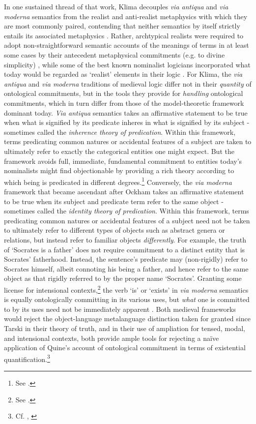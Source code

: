 \documentclass[]{article}
\begin{document}
In one sustained thread of that work, 
Klima decouples \emph{via antiqua} and \emph{via moderna} semantics 
from the realist and anti-realist metaphysics with which they are most commonly paired,
contending that neither semantics by itself strictly entails its associated metaphysics \autocite{Klima1999,Klima2011}. 
Rather, archtypical realists were required to adopt non-straightforward semantic accounts of the meanings of terms in at least some cases by their antecedent metaphysical commitments (e.g. to divine simplicity) \autocite{Klima2002b},
while some of the best known nominalist logicians incorporated what today would be regarded as `realist' elements in their logic \autocite{Klima2005}. 
For Klima, the \emph{via antiqua} and \emph{via moderna} traditions of medieval logic 
differ not in their \emph{quantity} of ontological commitments, 
but in the tools they provide for \emph{handling} ontological commitments, 
which in turn differ from those of the model-theoretic framework dominant today. 
\emph{Via antiqua} semantics takes an affirmative statement to be true when what is signified by its predicate inheres in what is signified by its subject - 
sometimes called the \emph{inherence theory of predication}. 
Within this framework, 
terms predicating common natures or accidental features of a subject are taken to ultimately refer to exactly the categorical entities one might expect. 
But the framework 
avoids full, immediate, fundamental commitment to entities today's nominalists might find objectionable by providing a rich theory according to which being is predicated in different degrees.\footnote{See \autocite{Klima2002}.}
Conversely, the \emph{via moderna} framework that became ascendant after Ockham 
takes an affirmative statement to be true when its subject and predicate term refer to the same object 
 - sometimes called the \emph{identity theory of predication}. 
Within this framework, 
terms predicating common natures or accidental features of a subject need not be taken to ultimately refer to different types of objects such as abstract genera or relations, 
but instead refer to familiar objects \emph{differently}. 
For example, the truth of `Socrates is a father' does not require commitment to a distinct entity that is Socrates' fatherhood.
Instead, the sentence's predicate may (non-rigidly) refer to Socrates himself, 
albeit connoting his being a father, 
and hence refer to the same object as that rigidly referred to by the proper name `Socrates'. 
Granting some license for intensional contexts,\footnote{See \autocite{Klima2005}.} 
the verb `is' or `exists' in \emph{via moderna} semantics is equally ontologically committing in its various uses, 
but \emph{what} one is committed to by its uses need not be immediately apparent  \autocite[437-430]{Klima2008a}. 
Both medieval frameworks would reject the object-language metalanguage distinction taken for granted since Tarski in their theory of truth, 
and 
in their use of ampliation for tensed, modal, and intensional contexts,
both provide ample tools for rejecting a na\"{i}ve application of Quine's account of ontological commitment in terms of existential quantification.\footnote{Cf. \autocite{Klima2004}, 
\autocite[171-174]{Klima2009}}
\end{document}

